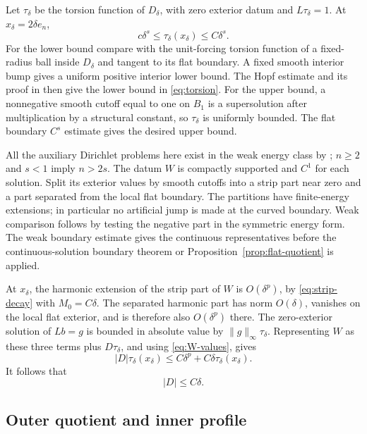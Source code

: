 \documentclass[11pt]{article}
\numberwithin{equation}{section}
\begin{document}
Let $\tau_\delta$ be the torsion function of $D_\delta$, with zero exterior
datum and $L\tau_\delta=1$. At $x_\delta=2\delta e_n$,
\begin{equation}\label{eq:torsion}
                  c\delta^s\leq\tau_\delta(x_\delta)\leq C\delta^s.
\end{equation}
For the lower bound compare with the unit-forcing torsion function of a
fixed-radius ball inside $D_\delta$ and tangent to its flat boundary. A fixed
smooth interior bump gives a uniform positive interior lower bound. The
Hopf estimate and its proof in \cite[Proposition 2.6.6]{FRRO} then give the
lower bound in \eqref{eq:torsion}. For the upper bound, a nonnegative smooth
cutoff equal to one on $B_1$ is a supersolution after multiplication by a
structural constant, so $\tau_\delta$ is uniformly bounded. The flat
boundary $C^s$ estimate gives the desired upper bound.

All the auxiliary Dirichlet problems here exist in the weak energy class
by \cite[Theorem 2.2.24]{FRRO}; $n\geq2$ and $s<1$ imply $n>2s$.
The datum $W$ is compactly supported and $C^1$ for each solution. Split its
exterior values by smooth cutoffs into a strip part near zero and a part
separated from the local flat boundary. The partitions have finite-energy
extensions; in particular no artificial jump is made at the curved boundary.
Weak comparison follows by testing the negative part in the symmetric energy
form. The weak boundary estimate \cite[Proposition 2.6.4]{FRRO} gives the
continuous representatives before the continuous-solution boundary theorem
or Proposition~\ref{prop:flat-quotient} is applied.

At $x_\delta$, the harmonic extension of the strip part of $W$ is
$O(\delta^p)$, by \eqref{eq:strip-decay} with $M_0=C\delta$.
The separated harmonic part has norm $O(\delta)$, vanishes on the local flat
exterior, and is therefore also $O(\delta^p)$ there. The zero-exterior
solution of $Lb=g$ is bounded in absolute value by
$\|g\|_\infty\tau_\delta$. Representing $W$ as these three terms plus
$D\tau_\delta$, and using \eqref{eq:W-values}, gives
\[
 |D|\tau_\delta(x_\delta)
      \leq C\delta^p+C\delta\tau_\delta(x_\delta).
\]
It follows that
\begin{equation}\label{eq:D-bound}
                              |D|\leq C\delta.
\end{equation}

\subsection{Outer quotient and inner profile}
\end{document}
